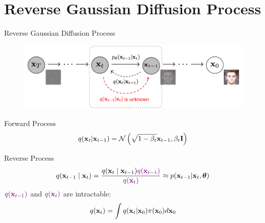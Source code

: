 \documentclass{beamer}
\begin{document}
\section{Reverse Gaussian Diffusion Process}
\begin{frame}{Reverse Gaussian Diffusion Process}
	\begin{figure}
		\includegraphics[width=0.8\linewidth]{figs/DDPM}
	\end{figure}
    \eqpause
	\vspace{-0.5cm}
	\begin{block}{Forward Process}
		\vspace{-0.3cm}
		\[
			q(\mathbf{x}_t | \mathbf{x}_{t-1}) = \mathcal{N}\left(\sqrt{1 - \beta_t} \mathbf{x}_{t-1}, \beta_t \mathbf{I}\right)
		\]
		\vspace{-0.5cm}
	\end{block}
    \eqpause
	\begin{block}{Reverse Process}
		\vspace{-0.3cm}
		\[
			q(\mathbf{x}_{t-1}\mid\mathbf{x}_{t}) = \frac{q(\mathbf{x}_{t}\mid\mathbf{x}_{t-1}) {\color{violet}q(\mathbf{x}_{t-1})}}{{\color{violet}q(\mathbf{x}_{t})}} \approx p(\mathbf{x}_{t - 1} | \mathbf{x}_t, \boldsymbol{\theta})
		\]
        \eqpause
		\vspace{-0.3cm}
		${\color{violet}q(\mathbf{x}_{t-1})}$ and ${\color{violet}q(\mathbf{x}_{t})}$ are intractable:
		\[
			q(\mathbf{x}_{t}) = \int q(\mathbf{x}_{t} | \mathbf{x}_0) \pi(\mathbf{x}_0) d\mathbf{x}_0
		\]
	\end{block}
\end{frame}
\end{document}
